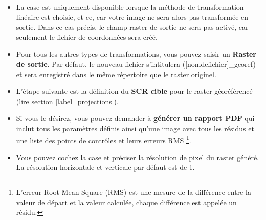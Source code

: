 \begin{itemize}[label=--]
\item La case  est uniquement disponible lorsque la méthode de transformation linéaire est choisie, et ce, car votre image ne sera alors pas transformée en sortie. Dans ce cas précis, le champ raster de sortie ne sera pas activé, car seulement le fichier de coordonnées sera créé.
\item Pour tous les autres types de transformations, vous pouvez saisir un \textbf{Raster de sortie}. Par défaut, le nouveau fichier s'intitulera ([nomdefichier]\_georef) et sera enregistré dans le même répertoire que le raster originel.
\item L'étape suivante est la définition du \textbf{SCR cible} pour le raster géoréférencé (lire section \ref{label_projections}). 
\item Si vous le désirez, vous pouvez demander à \textbf{générer un rapport PDF} qui inclut tous les paramètres définis ainsi qu'une image avec tous les résidus et une liste des points de contrôles et leurs erreurs RMS \footnote{L'erreur Root Mean Square (RMS) est une mesure de la différence entre la valeur de départ et la valeur calculée, chaque différence est appelée un résidu.}.
\item Vous pouvez cochez la case  et préciser la résolution de pixel du raster généré. La résolution horizontale et verticale par défaut est de 1.

\end{itemize}
